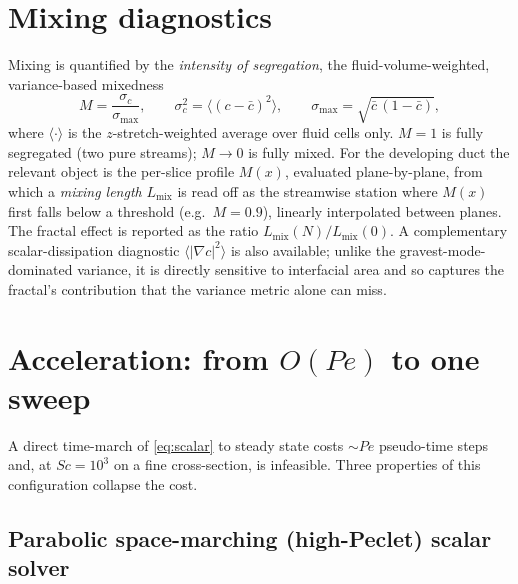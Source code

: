 \documentclass[11pt]{article}
\newcommand{\Sc}{\mathit{Sc}}
\newcommand{\Pe}{\mathit{Pe}}
\begin{document}
\section{Mixing diagnostics}

Mixing is quantified by the \emph{intensity of segregation}, the
fluid-volume-weighted, variance-based mixedness
\begin{equation}
  M = \frac{\sigma_c}{\sigma_{\max}},
  \qquad
  \sigma_c^2 = \langle (c - \bar c)^2\rangle,
  \qquad
  \sigma_{\max} = \sqrt{\bar c\,(1-\bar c)},
\end{equation}
where $\langle\cdot\rangle$ is the $z$-stretch-weighted average over
fluid cells only. $M = 1$ is fully segregated (two pure streams);
$M \to 0$ is fully mixed. For the developing duct the relevant object is
the per-slice profile $M(x)$, evaluated plane-by-plane, from which a
\emph{mixing length} $L_{\mathrm{mix}}$ is read off as the streamwise
station where $M(x)$ first falls below a threshold (e.g.\ $M = 0.9$),
linearly interpolated between planes. The fractal effect is reported as
the ratio $L_{\mathrm{mix}}(N)/L_{\mathrm{mix}}(0)$. A complementary
scalar-dissipation diagnostic $\langle|\nabla c|^2\rangle$ is also
available; unlike the gravest-mode-dominated variance, it is directly
sensitive to interfacial area and so captures the fractal's contribution
that the variance metric alone can miss.

\section{Acceleration: from $O(\Pe)$ to one sweep}
\label{sec:accel}

A direct time-march of \eqref{eq:scalar} to steady state costs $\sim\Pe$
pseudo-time steps and, at $\Sc = 10^3$ on a fine cross-section, is
infeasible. Three properties of this configuration collapse the cost.

\subsection{Parabolic space-marching (high-Peclet) scalar solver}
\end{document}
